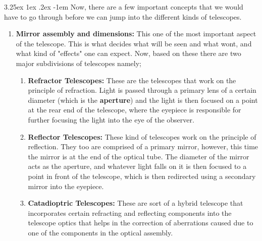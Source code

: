 \documentclass[a4paper,twoside,11pt]{article}
\makeatletter
\numberwithin{equation}{section}
\renewcommand\paragraph{\@startsection{paragraph}{5}{\z@}%
  {3.25ex \@plus1ex \@minus.2ex}%
  {-1em}%
  {\normalfont\normalsize\bfseries}}
\makeatother
\begin{document}
\paragraph{}
Now, there are a few important concepts that we would have to go through before we can jump into the different kinds of telescopes. 
\begin{enumerate}
\item {\textbf{Mirror assembly and dimensions:} This one of the most important aspect of the telescope. This is what decides what will be seen and what wont, and what kind of "effects" one can expect. Now, based on these there are two major subdivisions of telescopes namely;
\begin{enumerate}
\item \textbf{Refractor Telescopes:} These are the telescopes that work on the principle of refraction. Light is passed through a primary lens of a certain diameter (which is the \textbf{aperture}) and the light is then focused on a point at the rear end of the telescope, where the eyepiece is responsible for further focusing the light into the eye of the observer. 
\item \textbf{Reflector Telescopes: } These kind of telescopes work on the principle of reflection. They too are comprised of a primary mirror, however, this time the mirror is at the end of the optical tube. The diameter of the mirror acts as the aperture, and whatever light falls on it is then focused to a point in front of the telescope, which is then redirected using a secondary mirror into the eyepiece.
\item \textbf{Catadioptric Telescopes: } These are sort of a hybrid telescope that incorporates certain refracting and reflecting components into the telescope optics that helps in the correction of aberrations caused due to one of the components in the optical assembly. 

\end{enumerate}}
\end{enumerate}
\end{document}
